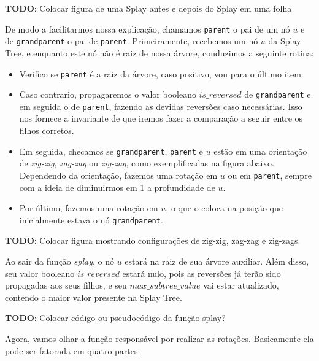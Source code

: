 \begin{center}
    \textbf{TODO}: Colocar figura de uma Splay antes e depois do Splay em uma folha
\end{center}

De modo a facilitarmos nossa explicação, chamamos \texttt{parent} o pai de um nó $u$ e de \texttt{grandparent} o pai de \texttt{parent}. Primeiramente, recebemos um nó $u$ da Splay Tree, e enquanto este nó não é raiz de nossa árvore, conduzimos a seguinte rotina:

\begin{itemize}
    \item Verifico se \texttt{parent} é a raiz da árvore, caso positivo, vou para o último item.
    \item Caso contrario, propagaremos o valor booleano $is\_reversed$ de \texttt{grandparent} e em seguida o de \texttt{parent}, fazendo as devidas reversões caso necessárias. Isso nos fornece a invariante de que iremos fazer a comparação a seguir entre os filhos corretos.
    \item Em seguida, checamos se \texttt{grandparent}, \texttt{parent} e $u$ estão em uma orientação de \textit{zig-zig}, \textit{zag-zag} ou \textit{zig-zag}, como exemplificadas na figura abaixo. Dependendo da orientação, fazemos uma rotação em $u$ ou em \texttt{parent}, sempre com a ideia de diminuirmos em 1 a profundidade de $u$.
    \item Por último, fazemos uma rotação em $u$, o que o coloca na posição que inicialmente estava o nó \texttt{grandparent}.
\end{itemize}

\begin{center}
    \textbf{TODO}: Colocar figura mostrando configurações de zig-zig, zag-zag e zig-zags.
\end{center}

Ao sair da função \emph{splay}, o nó $u$ estará na raiz de sua árvore auxiliar. Além disso, seu valor booleano $is\_reversed$ estará nulo, pois as reversões já terão sido propagadas aos seus filhos, e seu $max\_subtree\_value$ vai estar atualizado, contendo o maior valor presente na Splay Tree.

\begin{center}
    \textbf{TODO}: Colocar código ou pseudocódigo da função splay?
\end{center}

Agora, vamos olhar a função responsável por realizar as rotações. Basicamente ela pode ser fatorada em quatro partes:

